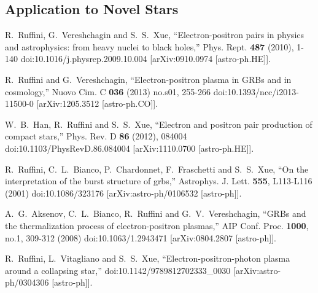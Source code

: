 \documentclass[universe,article,submit,moreauthors,pdftex,a4paper]{Definitions/mdpi}
\begin{document}
\subsection{Application to Novel Stars}


\begin{thebibliography}{99}

R.~Ruffini, G.~Vereshchagin and S.~S.~Xue,
``Electron-positron pairs in physics and astrophysics: from heavy nuclei to black holes,''
Phys. Rept. \textbf{487} (2010), 1-140
doi:10.1016/j.physrep.2009.10.004
[arXiv:0910.0974 [astro-ph.HE]].

R.~Ruffini and G.~Vereshchagin,
``Electron-positron plasma in GRBs and in cosmology,''
Nuovo Cim. C \textbf{036} (2013) no.s01, 255-266
doi:10.1393/ncc/i2013-11500-0
[arXiv:1205.3512 [astro-ph.CO]].

W.~B.~Han, R.~Ruffini and S.~S.~Xue,
``Electron and positron pair production of compact stars,''
Phys. Rev. D \textbf{86} (2012), 084004
doi:10.1103/PhysRevD.86.084004
[arXiv:1110.0700 [astro-ph.HE]].

R.~Ruffini, C.~L.~Bianco, P.~Chardonnet, F.~Fraschetti and S.~S.~Xue,
``On the interpretation of the burst structure of grbs,''
Astrophys. J. Lett. \textbf{555}, L113-L116 (2001)
doi:10.1086/323176
[arXiv:astro-ph/0106532 [astro-ph]].

A.~G.~Aksenov, C.~L.~Bianco, R.~Ruffini and G.~V.~Vereshchagin,
``GRBs and the thermalization process of electron-positron plasmas,''
AIP Conf. Proc. \textbf{1000}, no.1, 309-312 (2008)
doi:10.1063/1.2943471
[arXiv:0804.2807 [astro-ph]].

R.~Ruffini, L.~Vitagliano and S.~S.~Xue,
``Electron-positron-photon plasma around a collapsing star,''
doi:10.1142/9789812702333\_0030
[arXiv:astro-ph/0304306 [astro-ph]].


\end{thebibliography}
\end{document}
